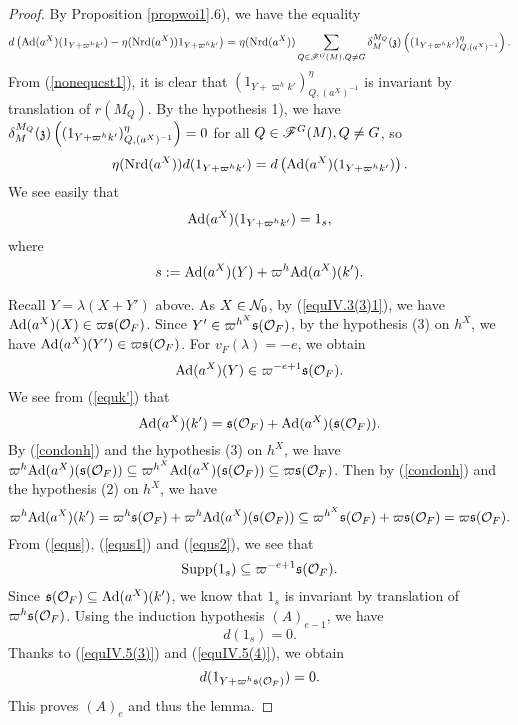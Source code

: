 \documentclass[a4paper]{amsart}
\theoremstyle{definition}
\theoremstyle{remark}
\numberwithin{equation}{subsection}
\begin{document}
\begin{proof}
By Proposition \ref{propwoi1}.6), we have the equality
$$ d\left({\mathrm{Ad}}(a^X)(1_{Y+\varpi^h k'})-\eta({\mathrm{Nrd}}(a^X))1_{Y+\varpi^h k'}\right)=\eta({\mathrm{Nrd}}(a^X)) \sum_{Q\in\mathscr{F}^G(M),Q\neq G} \delta_M^{M_Q}({\mathfrak{z}}) \left((1_{Y+\varpi^h k'})_{Q,(a^X)^{-1}}^\eta\right). $$
From (\ref{nonequcst1}), it is clear that $(1_{Y+\varpi^h k'})_{Q,(a^X)^{-1}}^\eta$ is invariant by translation of $r(M_Q)$. By the hypothesis 1), we have $\delta_M^{M_Q}({\mathfrak{z}}) \left((1_{Y+\varpi^h k'})_{Q,(a^X)^{-1}}^\eta\right)=0$ for all $Q\in\mathscr{F}^G(M),Q\neq G$, so
\begin{equation}\label{equIV.5(4)}
 \eta({\mathrm{Nrd}}(a^X))d(1_{Y+\varpi^h k'})=d\left({\mathrm{Ad}}(a^X)(1_{Y+\varpi^h k'})\right). 
\end{equation}
We see easily that
$$ {\mathrm{Ad}}(a^X)(1_{Y+\varpi^h k'})=1_s, $$
where
\begin{equation}\label{equs}
 s:={\mathrm{Ad}}(a^X)(Y)+\varpi^h{\mathrm{Ad}}(a^X)(k'). 
\end{equation}

Recall $Y=\lambda(X+Y')$ above. As $X\in{\mathcal {N}}_0$, by (\ref{equIV.3(3)1}), we have ${\mathrm{Ad}}(a^X)(X)\in\varpi{\mathfrak{s}}({\mathcal {O}}_F)$. Since $Y'\in\varpi^{h^X}{\mathfrak{s}}({\mathcal {O}}_F)$, by the hypothesis (3) on $h^X$, we have ${\mathrm{Ad}}(a^X)(Y')\in\varpi{\mathfrak{s}}({\mathcal {O}}_F)$. For $v_F(\lambda)=-e$, we obtain
\begin{equation}\label{equs1}
 {\mathrm{Ad}}(a^X)(Y)\in\varpi^{-e+1}{\mathfrak{s}}({\mathcal {O}}_F). 
\end{equation}
We see from (\ref{equk'}) that
$$ {\mathrm{Ad}}(a^X)(k')={\mathfrak{s}}({\mathcal {O}}_F)+{\mathrm{Ad}}(a^X)({\mathfrak{s}}({\mathcal {O}}_F)). $$
By (\ref{condonh}) and the hypothesis (3) on $h^X$, we have $\varpi^h{\mathrm{Ad}}(a^X)({\mathfrak{s}}({\mathcal {O}}_F))\subseteq\varpi^{h^X}{\mathrm{Ad}}(a^X)({\mathfrak{s}}({\mathcal {O}}_F))\subseteq\varpi{\mathfrak{s}}({\mathcal {O}}_F)$. Then by (\ref{condonh}) and the hypothesis (2) on $h^X$, we have
\begin{equation}\label{equs2}
 \varpi^h{\mathrm{Ad}}(a^X)(k')=\varpi^h{\mathfrak{s}}({\mathcal {O}}_F)+\varpi^h{\mathrm{Ad}}(a^X)({\mathfrak{s}}({\mathcal {O}}_F))\subseteq\varpi^{h^X}{\mathfrak{s}}({\mathcal {O}}_F)+\varpi{\mathfrak{s}}({\mathcal {O}}_F)=\varpi{\mathfrak{s}}({\mathcal {O}}_F). 
\end{equation}
From (\ref{equs}), (\ref{equs1}) and (\ref{equs2}), we see that
$$ {\mathrm{Supp}}(1_s)\subseteq\varpi^{-e+1}{\mathfrak{s}}({\mathcal {O}}_F). $$
Since ${\mathfrak{s}}({\mathcal {O}}_F)\subseteq{\mathrm{Ad}}(a^X)(k')$, we know that $1_s$ is invariant by translation of $\varpi^h{\mathfrak{s}}({\mathcal {O}}_F)$. Using the induction hypothesis $(A)_{e-1}$, we have
$$ d(1_s)=0. $$
Thanks to (\ref{equIV.5(3)}) and (\ref{equIV.5(4)}), we obtain
$$ d(1_{Y+\varpi^h{\mathfrak{s}}({\mathcal {O}}_F)})=0. $$
This proves $(A)_e$ and thus the lemma. 
\end{proof}
\end{document}
